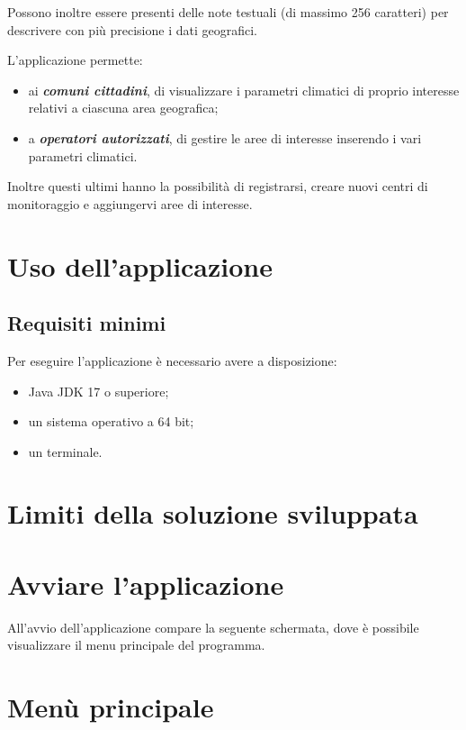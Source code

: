 Possono inoltre essere presenti delle note testuali (di massimo 256 caratteri) per descrivere con più precisione i dati geografici.

L'applicazione permette:
\begin{itemize}
	\item ai \textbf{\textsl{comuni cittadini}}, di visualizzare i parametri climatici di proprio interesse relativi a ciascuna area geografica;
	\item a \textbf{\textsl{operatori autorizzati}}, di gestire le aree di interesse inserendo i vari parametri climatici.
\end{itemize}
Inoltre questi ultimi hanno la possibilit\`a di registrarsi, creare nuovi centri di monitoraggio e aggiungervi aree di interesse.

\pagebreak

\chapter{Uso dell'applicazione}
\section{Requisiti minimi}
Per eseguire l’applicazione \`e necessario avere a disposizione:
\begin{itemize}
	\item Java JDK 17 o superiore;
	\item un sistema operativo a 64 bit;
	\item un terminale.
\end{itemize}
\chapter{Limiti della soluzione sviluppata}
\chapter{Avviare l'applicazione}
All’avvio dell’applicazione compare la seguente schermata, dove è possibile visualizzare il menu principale del programma.
\chapter{Menù principale}
